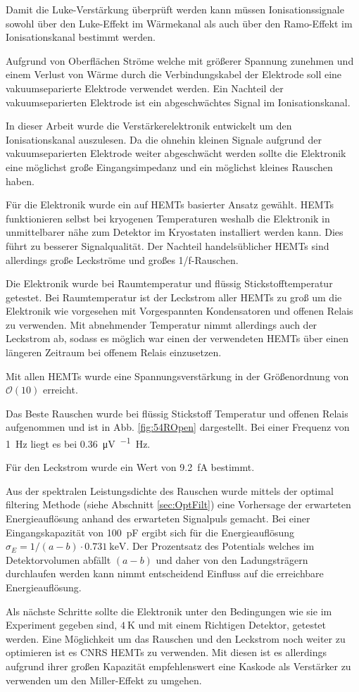 Damit die Luke-Verstärkung überprüft werden kann müssen Ionisationssignale sowohl über den Luke-Effekt im Wärmekanal als auch über den Ramo-Effekt im Ionisationskanal bestimmt werden.

Aufgrund von Oberflächen Ströme welche mit größerer Spannung zunehmen und einem Verlust von Wärme durch die Verbindungskabel der Elektrode soll eine vakuumseparierte Elektrode verwendet werden.
Ein Nachteil der vakuumseparierten Elektrode ist ein abgeschwächtes Signal im Ionisationskanal.

In dieser Arbeit wurde die Verstärkerelektronik entwickelt um den Ionisationskanal auszulesen.
Da die ohnehin kleinen Signale aufgrund der vakuumseparierten Elektrode weiter abgeschwächt werden sollte die Elektronik eine möglichst große Eingangsimpedanz und ein möglichst kleines Rauschen haben.

Für die Elektronik wurde ein auf HEMTs basierter Ansatz gewählt.
HEMTs funktionieren selbst bei kryogenen Temperaturen weshalb die Elektronik in unmittelbarer nähe zum Detektor im Kryostaten installiert werden kann.
Dies führt zu besserer Signalqualität.
Der Nachteil handelsüblicher HEMTs sind allerdings große Leckströme und großes 1/f-Rauschen.

Die Elektronik wurde bei Raumtemperatur und flüssig Stickstofftemperatur getestet.
Bei Raumtemperatur ist der Leckstrom aller HEMTs zu groß um die Elektronik wie vorgesehen mit Vorgespannten Kondensatoren und offenen Relais zu verwenden.
Mit abnehmender Temperatur nimmt allerdings auch der Leckstrom ab, sodass es möglich war einen der verwendeten HEMTs über einen längeren Zeitraum bei offenem Relais einzusetzen.

Mit allen HEMTs wurde eine Spannungsverstärkung in der Größenordnung von $\mathcal{O}(10)$ erreicht.

Das Beste Rauschen wurde bei flüssig Stickstoff Temperatur und offenen Relais aufgenommen und ist in Abb. \ref{fig:54ROpen} dargestellt.
Bei einer Frequenz von \SI{1}{\hertz} liegt es bei \SI{0,36}{\micro\volt\per\sqrt\hertz}.

Für den Leckstrom wurde ein Wert von \SI{9,2}{\femto\ampere} bestimmt.

Aus der spektralen Leistungsdichte des Rauschen wurde mittels der optimal filtering Methode (siehe Abschnitt \ref{sec:OptFilt}) eine Vorhersage der erwarteten Energieauflösung anhand des erwarteten Signalpuls gemacht.
Bei einer Eingangskapazität von \SI{100}{\pico\farad} ergibt sich für die Energieauflösung $\sigma_E = 1/(a-b)\cdot\SI{0,731}{\kilo\electronvolt}$.
Der Prozentsatz des Potentials welches im Detektorvolumen abfällt $(a-b)$ und daher von den Ladungsträgern durchlaufen werden kann nimmt entscheidend Einfluss auf die erreichbare Energieauflösung.

Als nächste Schritte sollte die Elektronik unter den Bedingungen wie sie im Experiment gegeben sind, $\SI{4}{\kelvin}$ und mit einem Richtigen Detektor, getestet werden.
Eine Möglichkeit um das Rauschen und den Leckstrom noch weiter zu optimieren ist es CNRS HEMTs zu verwenden.
Mit diesen ist es allerdings aufgrund ihrer großen Kapazität empfehlenswert eine Kaskode als Verstärker zu verwenden um den Miller-Effekt zu umgehen.